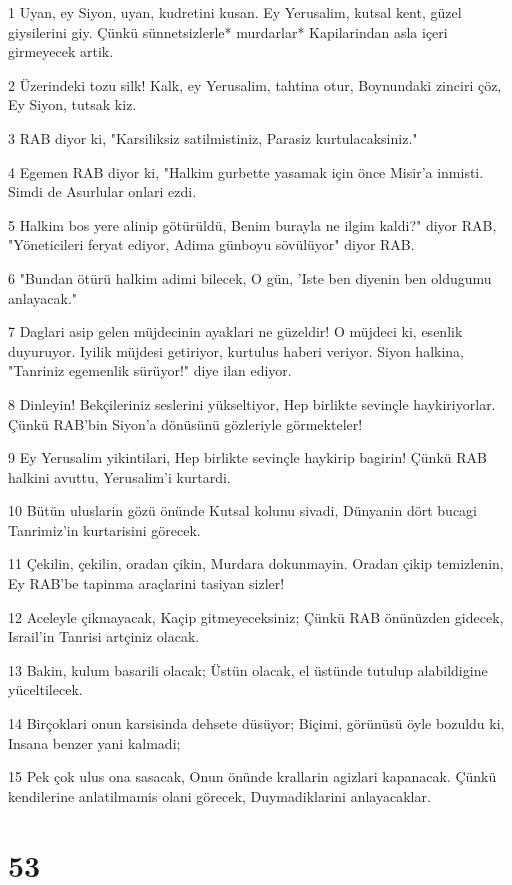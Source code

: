 \par 1 Uyan, ey Siyon, uyan, kudretini kusan. Ey Yerusalim, kutsal kent, güzel giysilerini giy. Çünkü sünnetsizlerle* murdarlar* Kapilarindan asla içeri girmeyecek artik.
\par 2 Üzerindeki tozu silk! Kalk, ey Yerusalim, tahtina otur, Boynundaki zinciri çöz, Ey Siyon, tutsak kiz.
\par 3 RAB diyor ki, "Karsiliksiz satilmistiniz, Parasiz kurtulacaksiniz."
\par 4 Egemen RAB diyor ki, "Halkim gurbette yasamak için önce Misir'a inmisti. Simdi de Asurlular onlari ezdi.
\par 5 Halkim bos yere alinip götürüldü, Benim burayla ne ilgim kaldi?" diyor RAB, "Yöneticileri feryat ediyor, Adima günboyu sövülüyor" diyor RAB.
\par 6 "Bundan ötürü halkim adimi bilecek, O gün, 'Iste ben diyenin ben oldugumu anlayacak."
\par 7 Daglari asip gelen müjdecinin ayaklari ne güzeldir! O müjdeci ki, esenlik duyuruyor. Iyilik müjdesi getiriyor, kurtulus haberi veriyor. Siyon halkina, "Tanriniz egemenlik sürüyor!" diye ilan ediyor.
\par 8 Dinleyin! Bekçileriniz seslerini yükseltiyor, Hep birlikte sevinçle haykiriyorlar. Çünkü RAB'bin Siyon'a dönüsünü gözleriyle görmekteler!
\par 9 Ey Yerusalim yikintilari, Hep birlikte sevinçle haykirip bagirin! Çünkü RAB halkini avuttu, Yerusalim'i kurtardi.
\par 10 Bütün uluslarin gözü önünde Kutsal kolunu sivadi, Dünyanin dört bucagi Tanrimiz'in kurtarisini görecek.
\par 11 Çekilin, çekilin, oradan çikin, Murdara dokunmayin. Oradan çikip temizlenin, Ey RAB'be tapinma araçlarini tasiyan sizler!
\par 12 Aceleyle çikmayacak, Kaçip gitmeyeceksiniz; Çünkü RAB önünüzden gidecek, Israil'in Tanrisi artçiniz olacak.
\par 13 Bakin, kulum basarili olacak; Üstün olacak, el üstünde tutulup alabildigine yüceltilecek.
\par 14 Birçoklari onun karsisinda dehsete düsüyor; Biçimi, görünüsü öyle bozuldu ki, Insana benzer yani kalmadi;
\par 15 Pek çok ulus ona sasacak, Onun önünde krallarin agizlari kapanacak. Çünkü kendilerine anlatilmamis olani görecek, Duymadiklarini anlayacaklar.

\chapter{53}

